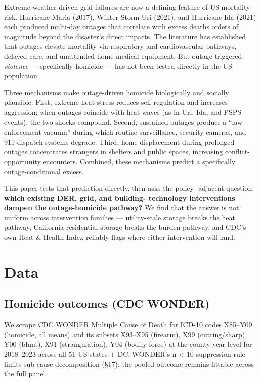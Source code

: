 \documentclass[
]{article}
\begin{document}
Extreme-weather-driven grid failures are now a defining feature of US
mortality risk. Hurricane Maria (2017), Winter Storm Uri (2021), and
Hurricane Ida (2021) each produced multi-day outages that correlate with
excess deaths orders of magnitude beyond the disaster's direct impacts.
The literature has established that outages elevate mortality via
respiratory and cardiovascular pathways, delayed care, and unattended
home medical equipment. But outage-triggered \emph{violence} ---
specifically homicide --- has not been tested directly in the US
population.

Three mechanisms make outage-driven homicide biologically and socially
plausible. First, extreme-heat stress reduces self-regulation and
increases aggression; when outages coincide with heat waves (as in Uri,
Ida, and PSPS events), the two shocks compound. Second, sustained
outages produce a ``law-enforcement vacuum'' during which routine
surveillance, security cameras, and 911-dispatch systems degrade. Third,
home displacement during prolonged outages concentrates strangers in
shelters and public spaces, increasing conflict-opportunity encounters.
Combined, these mechanisms predict a specifically outage-conditional
excess.

This paper tests that prediction directly, then asks the policy-
adjacent question: \textbf{which existing DER, grid, and building-
technology interventions dampen the outage-homicide pathway?} We find
that the answer is not uniform across intervention families ---
utility-scale storage breaks the heat pathway, California residential
storage breaks the burden pathway, and CDC's own Heat \& Health Index
reliably flags where either intervention will land.

\hypertarget{data}{%
\section{Data}\label{data}}

\hypertarget{homicide-outcomes-cdc-wonder}{%
\subsection{Homicide outcomes (CDC
WONDER)}\label{homicide-outcomes-cdc-wonder}}

We scrape CDC WONDER Multiple Cause of Death for ICD-10 codes X85--Y09
(homicide, all means) and its subsets X93--X95 (firearm), X99
(cutting/sharp), Y00 (blunt), X91 (strangulation), Y04 (bodily force) at
the county-year level for 2018--2023 across all 51 US states + DC.
WONDER's n \textless{} 10 suppression rule limits sub-cause
decomposition (§17); the pooled outcome remains fittable across the full
panel.
\end{document}
